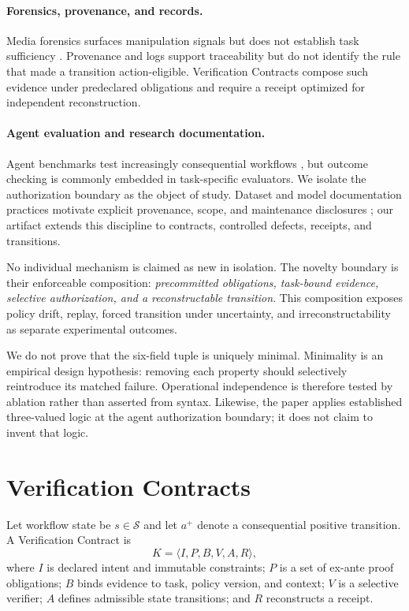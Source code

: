 \documentclass[sigconf,anonymous,review]{acmart}
\begin{document}
\paragraph{Forensics, provenance, and records.} Media forensics surfaces manipulation signals but does not establish task sufficiency \cite{verdoliva2020media}. Provenance and logs support traceability but do not identify the rule that made a transition action-eligible. Verification Contracts compose such evidence under predeclared obligations and require a receipt optimized for independent reconstruction.

\paragraph{Agent evaluation and research documentation.} Agent benchmarks test increasingly consequential workflows \cite{liu2023agentbench,zhou2023webarena,xie2024osworld,xu2024theagentcompany}, but outcome checking is commonly embedded in task-specific evaluators. We isolate the authorization boundary as the object of study. Dataset and model documentation practices motivate explicit provenance, scope, and maintenance disclosures \cite{bender2018data,gebru2021datasheets,mitchell2019modelcards}; our artifact extends this discipline to contracts, controlled defects, receipts, and transitions.

No individual mechanism is claimed as new in isolation. The novelty boundary is their enforceable composition: \emph{precommitted obligations, task-bound evidence, selective authorization, and a reconstructable transition}. This composition exposes policy drift, replay, forced transition under uncertainty, and irreconstructability as separate experimental outcomes.

We do not prove that the six-field tuple is uniquely minimal. Minimality is an empirical design hypothesis: removing each property should selectively reintroduce its matched failure. Operational independence is therefore tested by ablation rather than asserted from syntax. Likewise, the paper applies established three-valued logic at the agent authorization boundary; it does not claim to invent that logic.
\fussy

\section{Verification Contracts}
Let workflow state be $s\in\mathcal{S}$ and let $a^+$ denote a consequential positive transition. A Verification Contract is
\begin{equation}
K=\langle I,P,B,V,A,R\rangle,
\end{equation}
where $I$ is declared intent and immutable constraints; $P$ is a set of ex-ante proof obligations; $B$ binds evidence to task, policy version, and context; $V$ is a selective verifier; $A$ defines admissible state transitions; and $R$ reconstructs a receipt.
\end{document}
